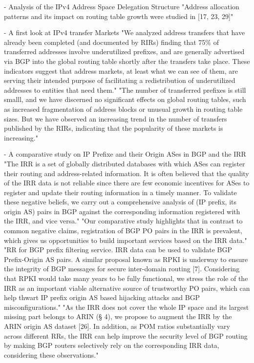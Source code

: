 \documentclass[11pt,a4paper]{scrreprt}
\begin{document}
- Analysis of the IPv4 Address Space Delegation Structure
 "Address allocation patterns and its impact on routing table growth were
studied in [17, 23, 29]" 


- A first look at IPv4 transfer Markets
"We analyzed address transfers that have already been completed (and documented by RIRs) finding that 75\% of transferred addresses involve underutilized prefixes, and are generally advertised via BGP into the global routing table shortly after the transfers take place. These indicators suggest that address markets, at least what we can see of them, are serving their intended purpose of facilitating a redistribution of underutilized addresses to entities that need them." "The number of transferred prefixes is still smalll, and we have discerned no significant effects on global routing tables, such as increased fragmentation of address blocks or unusual growth in routing table sizes. But we have observed an increasing trend in the number of transfers published by the RIRs, indicating that the popularity of these markets is increasing."

- A comparative study on IP Prefixe and their Origin ASes in BGP and the IRR
 "The IRR is a set of globally distributed databases with which ASes can register their routing and address-related information. It is often believed that the quality of the IRR data is not reliable since there are few economic incentives for ASes to register and update their routing information in a timely manner. To validate these negative beliefs, we carry out a comprehensive analysis of (IP prefix, its origin AS) pairs in BGP against the corresponding information registered with the IRR, and vice versa."
 "Our comparative study highlights that in contrast to common negative claims, registration of BGP PO pairs in the IRR is prevalent, which gives us opportunities to build important services based on the IRR data."
"RR for BGP prefix filtering service. IRR data can be used to validate BGP Prefix-Origin AS pairs. A similar proposal known as RPKI is underway to ensure the integrity of BGP messages for secure inter-domain routing [7]. Considering that RPKI would take many years to be fully functional, we stress the role of the IRR as an important viable alternative source of trustworthy PO pairs, which can help thwart IP prefix origin AS based hijacking attacks and BGP misconfigurations."
"As the IRR does not cover the whole IP space and its largest missing part belongs to ARIN (§ 4), we propose to augment the IRR by the ARIN origin AS dataset [26]. In addition, as POM ratios substantially vary across different RRs, the IRR can help improve the security level of BGP routing by making BGP routers selectively rely on the corresponding IRR data, considering these observations."
\end{document}

